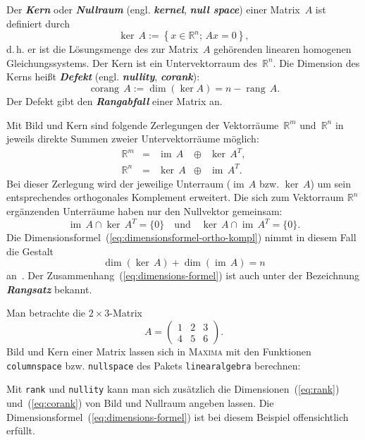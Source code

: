 Der \textbf{\em Kern} oder \textbf{\em Nullraum}
(engl. \textbf{\em kernel}, \textbf{\em null space}) einer Matrix~$A$ ist definiert
durch
\[
\ker\,A:=\left\{ x\in{\mathbb{R}}^{n};\,Ax=0\right\} ,
\]
d.\,h. er ist die Lösungsmenge des zur Matrix~$A$ gehörenden linearen
homogenen Gleichungssystems. Der Kern ist ein Untervektorraum des~${\mathbb{R}}^{n}$.
Die Dimension des Kerns heißt \textbf{\em Defekt} (engl. \textbf{\em nullity},
\textbf{\em corank}):
\begin{equation}
{\operatorname{corang}}\,A:=\dim(\ker A)=n-{\operatorname{rang}}\,A.\label{eq:corank}
\end{equation}
Der Defekt gibt den \textbf{\em Rangabfall} einer Matrix an.

Mit Bild und Kern sind folgende Zerlegungen der Vektorräume~${\mathbb{R}}^{m}$
und~${\mathbb{R}}^{n}$ in jeweils direkte Summen zweier Untervektorräume möglich:
\begin{equation}
\begin{array}{lcccc}
{\mathbb{R}}^{m} & = & {\operatorname{im}}\,A & \oplus & \ker\,A^{T},\\
{\mathbb{R}}^{n} & = & \ker\,A & \oplus & {\operatorname{im}}\,A^{T}.
\end{array}\label{eq:zerleg-im-ker}
\end{equation}
Bei dieser Zerlegung wird der jeweilige Unterraum (${\operatorname{im}}\,A$ bzw.
$\ker\,A$) um sein entsprechendes orthogonales Komplement erweitert.
Die sich zum Vektorraum ${\mathbb{R}}^{n}$ ergänzenden Unterräume haben nur
den Nullvektor gemeinsam:
\[
{\operatorname{im}}\,A\cap\ker\,A^{T}=\{0\}\quad\text{und}\quad\ker\,A\cap{\operatorname{im}}\,A^{T}=\{0\}.
\]
Die Dimensionsformel~(\ref{eq:dimensionsformel-ortho-kompl})
nimmt in diesem Fall die Gestalt
\begin{equation}
\dim(\ker\,A)+\dim({\operatorname{im}}\,A)=n\label{eq:dimensions-formel}
\end{equation}
an~\cite{lorenz1992,beutelspacher2001}. Der Zusammenhang~(\ref{eq:dimensions-formel})
ist auch unter der Bezeichnung \textbf{\em Rangsatz} bekannt.
\begin{example}
\label{exa:Bild-und-Kern}Man betrachte die $2\times3$-Matrix
\[
A=\left(\begin{array}{ccc}
1 & 2 & 3\\
4 & 5 & 6
\end{array}\right).
\]
Bild und Kern einer Matrix lassen sich in \textsc{Maxima} mit den
Funktionen \texttt{columnspace} bzw. \texttt{nullspace} des Pakets
\texttt{linearalgebra} berechnen:



Mit \texttt{rank} und \texttt{nullity} kann man sich zusätzlich die
Dimensionen~(\ref{eq:rank}) und~(\ref{eq:corank}) von Bild und
Nullraum angeben lassen. Die Dimensionsformel~(\ref{eq:dimensions-formel})
ist bei diesem Beispiel offensichtlich erfüllt.

\end{example}
